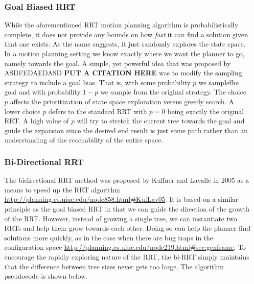 \subsubsection{Goal Biased RRT} \label{planning:goal-bias}
While the aforementioned RRT motion planning algorithm is probabilistically complete, it does not provide any bounds on how \emph{fast} it can find a solution given that one exists. As the name suggests, it just randomly explores the state space. In a motion planning setting we know exactly where we want the planner to go, namely towards the goal. A simple, yet powerful idea that was proposed by ASDFEDAEDASD \textbf{PUT A CITATION HERE} was to modify the sampling strategy to include a goal bias. That is, with some probability $p$ we \"sample\" the goal and with probability $1-p$ we sample from the original strategy. The choice $p$ affects the prioritization of state space exploration versus greedy search. A lower choice $p$ defers to the standard RRT with $p=0$ being exactly the original RRT. A high value of $p$ will try to stretch the current tree towards the goal and guide the expansion since the desired end result is just some path rather than an understanding of the reachability of the entire space.

\subsubsection{Bi-Directional RRT} \label{planning:birrt}
The bidirectional RRT method was proposed by  Kuffner and Lavalle in 2005 as a means to speed up the RRT algorithm \url{http://planning.cs.uiuc.edu/node858.html#KufLav05}. It is based on a similar principle as the goal biased RRT in that we can guide the direction of the growth of the RRT. However, instead of growing a single tree, we can instantiate two RRTs and help them grow towards each other. Doing so can help the planner find solutions more quickly, as in the case when there are bug traps in the configuration space \url{http://planning.cs.uiuc.edu/node219.html#sec:genframe}. To encourage the rapidly exploring nature of the RRT, the bi-RRT simply maintains that the difference between tree sizes never gets too large. The algorithm pseudocode is shown below.

